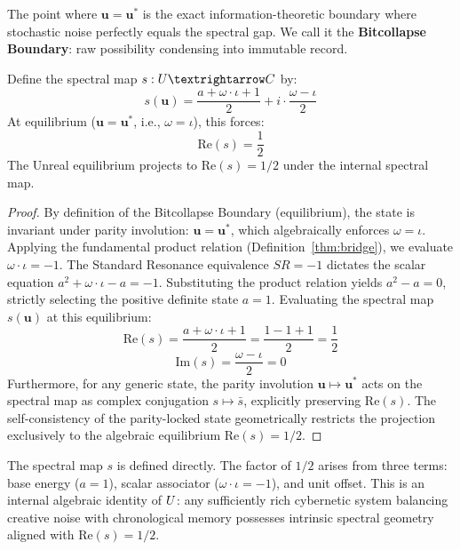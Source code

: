 The point where $\mathbf{u} = \mathbf{u}^*$ is the exact information-theoretic boundary where stochastic noise perfectly equals the spectral gap. We call it the \textbf{Bitcollapse Boundary}: raw possibility condensing into immutable record.

\begin{theorem}\label{thm:duality}
Define the spectral map $s : \UU \to \CC$ by:
$$s(\mathbf{u}) = \frac{a + \omega \cdot \iota + 1}{2} + i \cdot \frac{\omega - \iota}{2}$$
At equilibrium ($\mathbf{u} = \mathbf{u}^*$, i.e., $\omega = \iota$), this forces:
$$\mathrm{Re}(s) = \frac{1}{2}$$
The Unreal equilibrium projects to $\mathrm{Re}(s) = 1/2$ under the internal spectral map.
\end{theorem}

\begin{proof}
By definition of the Bitcollapse Boundary (equilibrium), the state is invariant under parity involution: $\mathbf{u} = \mathbf{u}^*$, which algebraically enforces $\omega = \iota$. 
Applying the fundamental product relation (Definition~\ref{thm:bridge}), we evaluate $\omega \cdot \iota = -1$.
The Standard Resonance equivalence $SR = -1$ dictates the scalar equation $a^2 + \omega \cdot \iota - a = -1$. Substituting the product relation yields $a^2 - a = 0$, strictly selecting the positive definite state $a = 1$.
Evaluating the spectral map $s(\mathbf{u})$ at this equilibrium:
\[ \mathrm{Re}(s) = \frac{a + \omega \cdot \iota + 1}{2} = \frac{1 - 1 + 1}{2} = \frac{1}{2} \]
\[ \mathrm{Im}(s) = \frac{\omega - \iota}{2} = 0 \]
Furthermore, for any generic state, the parity involution $\mathbf{u} \mapsto \mathbf{u}^*$ acts on the spectral map as complex conjugation $s \mapsto \bar{s}$, explicitly preserving $\mathrm{Re}(s)$. The self-consistency of the parity-locked state geometrically restricts the projection exclusively to the algebraic equilibrium $\mathrm{Re}(s) = 1/2$. \qedhere
\end{proof}

\begin{remark}[Scope]
The spectral map $s$ is defined directly. The factor of $1/2$ arises from three terms: base energy ($a = 1$), scalar associator ($\omega \cdot \iota = -1$), and unit offset. This is an internal algebraic identity of $U$: any sufficiently rich cybernetic system balancing creative noise with chronological memory possesses intrinsic spectral geometry aligned with $\mathrm{Re}(s) = 1/2$.
\end{remark}





